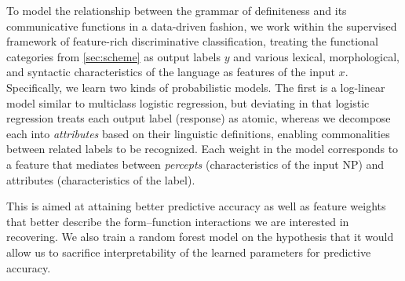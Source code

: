 \documentclass[11pt,letterpaper]{article}
\newcommand{\ensuretext}[1]{#1}
\newcommand{\nssmarker}{\ensuretext{\textcolor{magenta}{\ensuremath{^{\textsc{NS}}_{\textsc{S}}}}}}
\newcommand{\abmarker}{\ensuretext{\textcolor{red}{\ensuremath{^{\textsc{A}}_{\textsc{B}}}}}}
\newcommand{\arkcomment}[3]{\ensuretext{\textcolor{#3}{[#1 #2]}}}
\newcommand{\nss}[1]{\arkcomment{\nssmarker}{#1}{magenta}}
\newcommand{\ab}[1]{\arkcomment{\abmarker}{#1}{red}}
\newcommand{\costversion}[1]{}
\begin{document}
To model the relationship between the grammar of definiteness and its communicative functions in a data-driven fashion,
we work within the supervised framework of feature-rich discriminative classification, 
treating the functional categories from \cref{sec:scheme} as output labels $y$
and various lexical, morphological, and syntactic characteristics of the language as features of the input $x$.
Specifically, we learn two kinds of probabilistic models. 
The first is a log-linear model similar to multiclass logistic regression, 
but deviating in that
logistic regression treats each output label (response) as atomic, whereas 
we decompose each into \emph{attributes} based on their linguistic definitions, 
enabling commonalities between related labels to be recognized.
Each weight in the model corresponds to a feature that mediates between 
\emph{percepts} (characteristics of the input NP) and attributes (characteristics of the label). %
\costversion{\nss{}the following ways:
\begin{itemize}
  \item Logistic regression treats each output label (response) as atomic; 
  we decompose each into \emph{attributes} based on their linguistic definitions, 
  enabling commonalities between related labels to be recognized.
  Each weight in the model corresponds to a feature that mediates between 
  \emph{percepts} (characteristics of the input NP) and attributes (characteristics of the label).
  \item Logistic regression assumes a prediction is either correct or incorrect.
  We incorporate a \emph{cost function} that gives partial credit during learning when a related label 
  is predicted, so the learned model will better match our evaluation measure.
  \item Logistic regression assumes the space of possible predictions matches 
  the space of labels observed in the training data; we allow more abstract labels to be predicted, 
  which can receive partial credit. The scoring scheme encourages the predictor to ``back off'' 
  to a coarser label if it is not sufficiently confident about a fine-grained label.
\end{itemize}
These decisions are\nss{}}
This is aimed at attaining better predictive accuracy 
as well as feature weights that better describe the form--function interactions we are interested in recovering.
We also train a random forest model on the hypothesis that 
it would allow us to sacrifice interpretability of the learned parameters for predictive accuracy.
\end{document}

